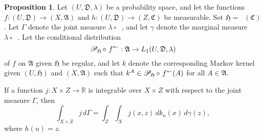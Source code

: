 \documentclass[
twoside=true,
paper=letter,
fontsize=9pt,
pagesize=auto,
leqno,
openany,
headsepline,
overfullrule,
]{scrbook}
\theoremstyle{plain}
\theoremstyle{plain}
\theoremstyle{definition}
\theoremstyle{bfnoteitalic}
\newtheorem{propboldnote}[thm]{Proposition}
\theoremstyle{bfnoteroman}
\newcommand{\sigalg}[1]{\mathfrak{#1}}
\newcommand{\cali}[1]{\mathscr{#1}}
\newcommand{\condprobop}[1]{\mathop{\cali{P}\hspace{-1pt}}\nolimits_{#1}}
\newcommand{\preimage}[1]{\mathop{#1^{\leftarrow}}}
\newcommand{\R}{\mathbb{R}}
\newcommand{\sigmaalgebra}{\sigalg{A}}
\newcommand{\sigmaalgebraiii}{\sigalg{C}}
\newcommand{\funch}{h}
\newcommand{\funcj}{j}
\newcommand{\funck}{k}
\newcommand{\function}{f}
\newcommand{\functioniii}{h}
\newcommand{\measurespace}{X}
\newcommand{\measurespaceiii}{Z}
\newcommand{\mspaceelt}{x}
\newcommand{\mspaceeltiii}{z}
\newcommand{\measureiii}{\lambda}
\newcommand{\measlambda}{\lambda}
\newcommand{\seti}{A}
\newcommand{\uspace}{U}%
\newcommand{\uspaceelt}{u}
\newcommand{\uspacesig}{\sigalg{D}}
\newcommand{\measonprod}{\Gamma}%
\newcommand{\marginalthree}{\gamma}
\begin{document}
\begin{propboldnote}\label{joint_decomposition}
Let
$(\uspace, \uspacesig, \measureiii)$
be a probability space, and let the functions
$\function:(\uspace,\uspacesig)\to (\measurespace,\sigmaalgebra)$
and
$\functioniii:(\uspace,\uspacesig)\to (\measurespaceiii,\sigmaalgebraiii)$
be measurable. Set
$\sigalg{H} = \preimage{\functioniii}(\sigmaalgebraiii)$.
Let $\measonprod$ denote the joint measure  $\measureiii\circ\preimage{(\function,\functioniii)}$,
and let $\marginalthree$ denote the marginal measure $\measlambda\circ\preimage{\funch}$.
Let the conditional distribution
\[
\condprobop{\sigalg{H}}\circ\, \preimage{\function}:
\sigmaalgebra \to L_1(\uspace,\uspacesig,\measureiii)
\]
of $\function$ on $\sigmaalgebra$ given $\sigalg{H}$
be regular, and let
$\funck$
denote the corresponding Markov kernel given
$(\uspace,\sigalg{H})$ and $(\measurespace,\sigmaalgebra)$ such that
$\funck^\seti\in
\condprobop{\sigalg{H}}\circ\, \preimage{\function}(\seti)$
for all $\seti\in\sigmaalgebra$.

If a function
$j:\measurespace\times\measurespaceiii \to \R$
is integrable over
$\measurespace\times\measurespaceiii$
with respect to the joint measure $\measonprod$,
then
\[
\int_{\measurespace\times\measurespaceiii} \funcj \,
d \measonprod
=
\int_\measurespaceiii\int_\measurespace
\funcj(\mspaceelt,\mspaceeltiii) \,
d \funck_\uspaceelt(\mspaceelt)\,
d \marginalthree(\mspaceeltiii),
\]
where  $\funch(\uspaceelt) = \mspaceeltiii$.
\end{propboldnote}
\end{document}
